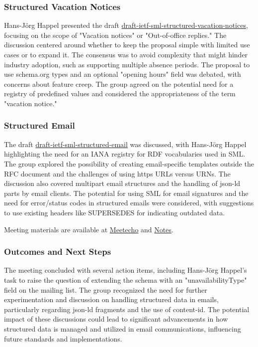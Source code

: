 \documentclass{article}
\begin{document}
\subsubsection{Structured Vacation Notices}
Hans-Jörg Happel presented the draft \href{https://datatracker.ietf.org/doc/html/draft-ietf-sml-structured-vacation-notices}{draft-ietf-sml-structured-vacation-notices}, focusing on the scope of "Vacation notices" or "Out-of-office replies." The discussion centered around whether to keep the proposal simple with limited use cases or to expand it. The consensus was to avoid complexity that might hinder industry adoption, such as supporting multiple absence periods. The proposal to use schema.org types and an optional "opening hours" field was debated, with concerns about feature creep. The group agreed on the potential need for a registry of predefined values and considered the appropriateness of the term "vacation notice."

\subsubsection{Structured Email}
The draft \href{https://datatracker.ietf.org/doc/html/draft-ietf-sml-structured-email}{draft-ietf-sml-structured-email} was discussed, with Hans-Jörg Happel highlighting the need for an IANA registry for RDF vocabularies used in SML. The group explored the possibility of creating email-specific templates outside the RFC document and the challenges of using https URLs versus URNs. The discussion also covered multipart email structures and the handling of json-ld parts by email clients. The potential for using SML for email signatures and the need for error/status codes in structured emails were considered, with suggestions to use existing headers like SUPERSEDES for indicating outdated data.

Meeting materials are available at \href{https://meetings.conf.meetecho.com/ietf122/?group=sml&short=&item=1}{Meetecho} and \href{https://notes.ietf.org/notes-ietf-122-sml}{Notes}.

\subsubsection{Outcomes and Next Steps}
The meeting concluded with several action items, including Hans-Jörg Happel's task to raise the question of extending the schema with an "unavailabilityType" field on the mailing list. The group recognized the need for further experimentation and discussion on handling structured data in emails, particularly regarding json-ld fragments and the use of content-id. The potential impact of these discussions could lead to significant advancements in how structured data is managed and utilized in email communications, influencing future standards and implementations.
\end{document}
